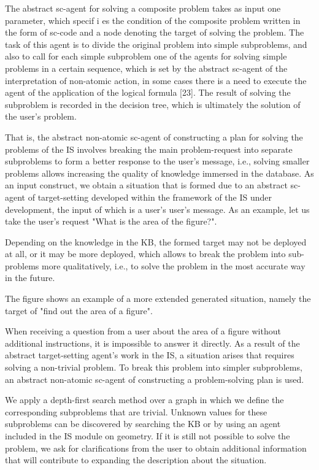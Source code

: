 \documentclass[a4paper, 10pt,]{article}
\begin{document}
The abstract sc-agent for solving a composite problem takes as input one parameter, which specif i es the condition of the composite problem written in the form of sc-code and a node denoting the target of solving the problem. The task of this agent is to divide the original problem into simple subproblems, and also to call for each simple subproblem one of the agents for solving simple problems in a certain sequence, which is set by the abstract sc-agent of the interpretation of non-atomic action, in some cases there is a need to execute the agent of the application of the logical formula [23]. The result of solving the subproblem is recorded in the decision tree, which is ultimately the solution of the user’s problem.

That is, the abstract non-atomic sc-agent of constructing a plan for solving the problems of the IS involves breaking the main problem-request into separate subproblems to form a better response to the user’s message, i.e., solving smaller problems allows increasing the quality of knowledge immersed in the database. As an input construct, we obtain a situation that is formed due to an abstract sc-agent of target-setting developed within the framework of the IS under development, the input of which is a user’s user’s message. As an example, let us take the user’s request "What is the area of the figure?".

Depending on the knowledge in the KB, the formed target may not be deployed at all, or it may be more deployed, which allows to break the problem into sub-problems more qualitatively, i.e., to solve the problem in the most accurate way in the future.

The figure \pageref {fig:picture}  shows an example of a more extended generated situation, namely the target of "find out the area of a figure".

When receiving a question from a user about the area of a figure without additional instructions, it is impossible to answer it directly. As a result of the abstract target-setting agent’s work in the IS, a situation arises that requires solving a non-trivial problem. To break this problem into simpler subproblems, an abstract non-atomic sc-agent of constructing a problem-solving plan is used.

We apply a depth-first search method over a graph in which we define the corresponding subproblems that are trivial. Unknown values for these subproblems can be discovered by searching the KB or by using an agent included in the IS module on geometry. If it is still not possible to solve the problem, we ask for clarifications from the user to obtain additional information that will contribute to expanding the description about the situation.
\end{document}
